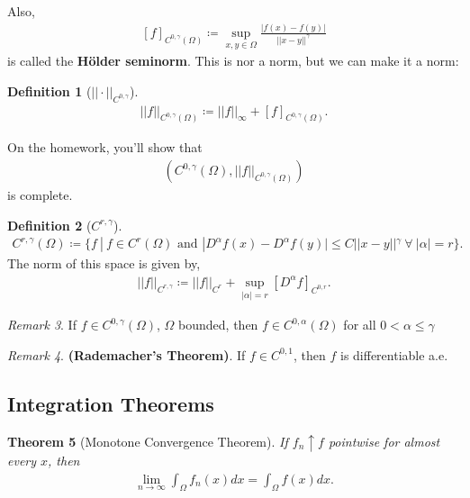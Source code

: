 \documentclass[psamsfonts]{amsart}
\newcommand{\given}{\ |\ }
\newtheorem{thm}{Theorem}[section]
\theoremstyle{definition}
\newtheorem{defn}[thm]{Definition}
\theoremstyle{remark}
\newtheorem{rem}[thm]{Remark}
\numberwithin{equation}{section}
\begin{document}
Also, 
\begin{align*}
	\boxed{[f]_{C^{0, \gamma}(\Omega)} \coloneqq \sup_{x, y \in \Omega} \frac{|f(x) - f(y) |}{|| x- y ||^\gamma}}
\end{align*}
is called the \textbf{Hölder seminorm}. This is nor a norm, but we can make it a norm: 
\begin{defn}[\( || \cdot ||_{C^{0,\gamma}} \)]
	\begin{align}
		\boxed{||f||_{C^{0, \gamma}(\Omega)} \coloneqq ||f||_\infty + [f]_{C^{0, \gamma} (\Omega)}.} 	
	\end{align}
\end{defn}
On the homework, you'll show that 
\begin{align*}
	(C^{0, \gamma}(\Omega), ||f||_{C^{0, \gamma}(\Omega)}) 
\end{align*}
is complete.
\begin{defn}[\(C^{r, \gamma} \)]
\begin{align}
		\boxed{C^{r, \gamma}(\Omega) \coloneqq \{ f \given f \in C^r(\Omega) \text{ and } |D^\alpha f(x) - D^\alpha f(y) | \leq C || x-y||^\gamma\ \forall \ |\alpha| = r \}}.
\end{align} 
The norm of this space is given by, 
\begin{align}
	\boxed{|| f||_{C^{r, \gamma}} \coloneqq ||f||_{C^r} + \sup_{|\alpha| = r} [D^\alpha f]_{C^{0,r}}.}	
\end{align}
\end{defn}

\begin{rem}
	If \( f \in C^{0, \gamma}(\Omega) \), \( \Omega \) bounded, then \( f \in C^{0, \alpha}(\Omega) \) for all \( 0 < \alpha \leq \gamma \)	
\end{rem}


\begin{rem}
	\textbf{(Rademacher's Theorem)}. If \( f \in C^{0,1} \), then \( f \) is differentiable a.e.	
\end{rem}

\subsection{Integration Theorems}

\begin{thm}[Monotone Convergence Theorem]
		If \( f_n \uparrow f \) pointwise for almost every \( x \), then 
		\begin{align}
			\boxed{\lim_{n \rightarrow \infty} \int_{\Omega} f_n(x) dx = \int_{\Omega} f(x) dx}.
		\end{align}
\end{thm}
\end{document}
